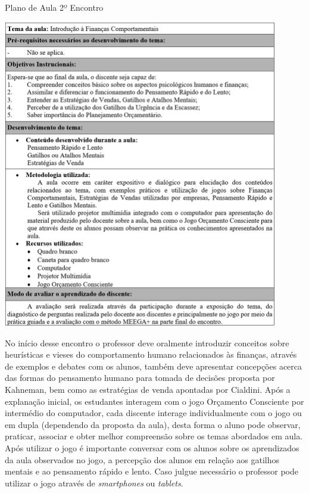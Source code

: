 \graphicspath{{quadros/}} 
\begin{quadro}[!ht]
\centering
\begin{minipage}{0.8\textwidth}
\caption{Plano de Aula 2º Encontro}
\centering
\includegraphics[width=0.9\textwidth]{quadro-08-aula 2}
\label{quad: quadro-08-aula 2}
\end{minipage}
\end{quadro}

No início desse encontro o professor deve oralmente introduzir conceitos sobre heurísticas e vieses do comportamento humano relacionados às finanças, através de exemplos e debates com os alunos, também deve apresentar concepções acerca das formas do pensamento humano para tomada de decisões proposta por Kahneman, bem como as estratégias de venda apontadas por Cialdini. Após a explanação inicial, os estudantes interagem com o jogo Orçamento Consciente por intermédio do computador, cada discente interage individualmente com o jogo ou em dupla (dependendo da proposta da aula), desta forma o aluno pode observar, praticar, associar e obter melhor compreensão sobre os temas abordados em aula. Após utilizar o jogo é importante conversar com os alunos sobre os aprendizados da aula observados no jogo, a percepção dos alunos em relação aos gatilhos mentais e ao pensamento rápido e lento. Caso julgue necessário o professor pode utilizar o jogo através de \textit{smartphones} ou \textit{tablets}.


